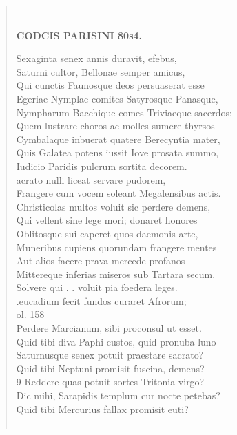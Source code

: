 \documentclass[11pt, a4paper]{report}
\begin{document}
\begin{verse}
        ﻿\pagebreak 
    \begin{center} \textbf{CODCIS PARISINI 80s4.} \end{center}Sexaginta senex annis duravit, efebus, \\ Saturni cultor, Bellonae semper amicus, \\ Qui cunctis Faunosque deos persuaserat esse \\ Egeriae Nymplae comites Satyrosque Panasque, \\ Nympharum Bacchique comes Triviaeque sacerdos; \\ Quem lustrare choros ac molles sumere thyrsos \\ Cymbalaque inbuerat quatere Berecyntia mater, \\ Quis Galatea potens iussit Iove prosata summo, \\ Iudicio Paridis pulcrum sortita decorem. \\ acrato nulli liceat servare pudorem, \\ Frangere cum vocem soleant Megalensibus actis. \\ Christicolas multos voluit sic perdere demens, \\ Qui vellent sine lege mori; donaret honores \\ Oblitosque sui caperet quos daemonis arte, \\ Muneribus cupiens quorundam frangere mentes \\ Aut alios facere prava mercede profanos \\ Mittereque inferias miseros sub Tartara secum. \\ Solvere qui . . voluit pia foedera leges. \\ .eucadium fecit fundos curaret Afrorum; \\ ol. 158 \\ Perdere Marcianum, sibi proconsul ut esset. \\ Quid tibi diva Paphi custos, quid pronuba luno \\ Saturnusque senex potuit praestare sacrato? \\ Quid tibi Neptuni promisit fuscina, demens? \\ 9 Reddere quas potuit sortes Tritonia virgo? \\ Dic mihi, Sarapidis templum cur nocte petebas? \\ Quid tibi Mercurius fallax promisit euti? \\ 
        ﻿\pagebreak 

\end{verse}
\end{document}
